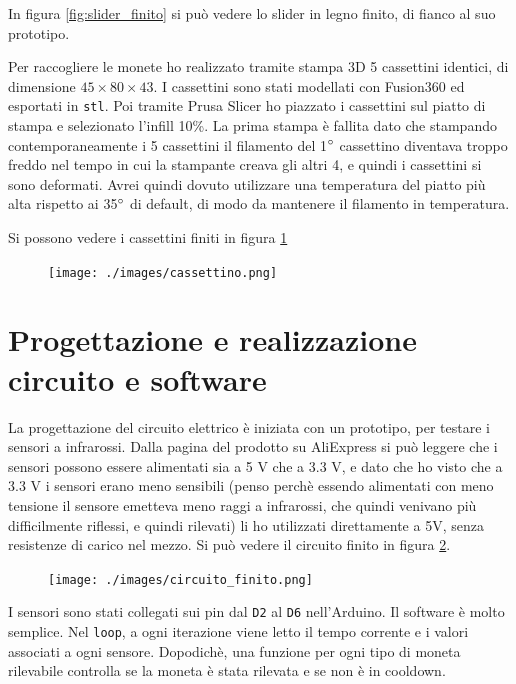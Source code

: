 \documentclass{article}
\begin{document}
In figura \ref{fig:slider_finito} si può vedere lo slider in legno finito, di fianco al suo prototipo.

Per raccogliere le monete ho realizzato tramite stampa 3D 5 cassettini identici, di dimensione $45 \times 80 \times 43$.
I cassettini sono stati modellati con Fusion360 ed esportati in \verb|stl|. Poi tramite Prusa Slicer ho piazzato i cassettini sul piatto di stampa e selezionato l'infill 10\%.
La prima stampa è fallita dato che stampando contemporaneamente i 5 cassettini il filamento del 1$\degree$ cassettino diventava troppo freddo nel tempo in cui la stampante creava gli altri 4, e quindi i cassettini si sono deformati.
Avrei quindi dovuto utilizzare una temperatura del piatto più alta rispetto ai 35$\degree$ di default, di modo da mantenere il filamento in temperatura.

Si possono vedere i cassettini finiti in figura \ref{fig:cassettino}

\begin{figure}[htbp]
  \centering
  \texttt{[image: ./images/cassettino.png]}
  \caption{}
  \label{fig:cassettino}
\end{figure}

\section{Progettazione e realizzazione circuito e software}

La progettazione del circuito elettrico è iniziata con un prototipo, per testare i sensori a infrarossi.
Dalla pagina del prodotto su AliExpress si può leggere che i sensori possono essere alimentati sia a 5 V che a 3.3 V, e dato che ho visto che a 3.3 V i sensori erano meno sensibili (penso perchè essendo alimentati con meno tensione il sensore emetteva meno raggi a infrarossi, che quindi venivano più difficilmente riflessi, e quindi rilevati) li ho utilizzati direttamente a 5V, senza resistenze di carico nel mezzo.
Si può vedere il circuito finito in figura \ref{fig:circuito_finito}.

\begin{figure}[htbp]
  \centering
  \texttt{[image: ./images/circuito\_finito.png]}
  \caption{}
  \label{fig:circuito_finito}
\end{figure}

I sensori sono stati collegati sui pin dal \verb|D2| al \verb|D6| nell'Arduino.
Il software è molto semplice.
Nel \verb|loop|, a ogni iterazione viene letto il tempo corrente e i valori associati a ogni sensore.
Dopodichè, una funzione per ogni tipo di moneta rilevabile controlla se la moneta è stata rilevata e se non è in cooldown.
\end{document}
